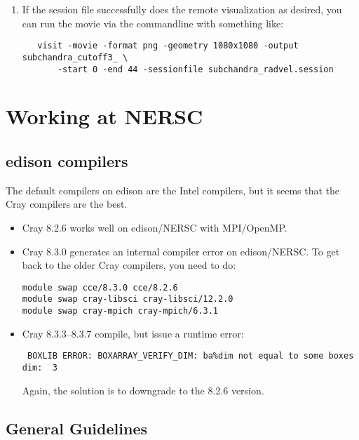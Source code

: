 \begin{itemize}
\begin{enumerate}
  \item If the session file successfully does the remote visualization
   as desired, you can run the movie via the commandline with something like:

   \begin{verbatim}
   visit -movie -format png -geometry 1080x1080 -output subchandra_cutoff3_ \
       -start 0 -end 44 -sessionfile subchandra_radvel.session
   \end{verbatim}

  \end{enumerate}

\end{itemize}


\section{Working at NERSC}

\subsection{edison compilers}

The default compilers on edison are the Intel compilers, but
it seems that the Cray compilers are the best.

\begin{itemize}
\item Cray 8.2.6 works well on edison/NERSC with MPI/OpenMP.

\item Cray 8.3.0 generates an internal compiler error on edison/NERSC.
      To get back to the older Cray compilers, you need to do:

\begin{verbatim}
module swap cce/8.3.0 cce/8.2.6
module swap cray-libsci cray-libsci/12.2.0
module swap cray-mpich cray-mpich/6.3.1
\end{verbatim}

\item Cray 8.3.3--8.3.7 compile, but issue a runtime error:
\begin{verbatim}
 BOXLIB ERROR: BOXARRAY_VERIFY_DIM: ba%dim not equal to some boxes dim:  3
\end{verbatim}
Again, the solution is to downgrade to the 8.2.6 version.

\end{itemize}


\subsection{General Guidelines}

